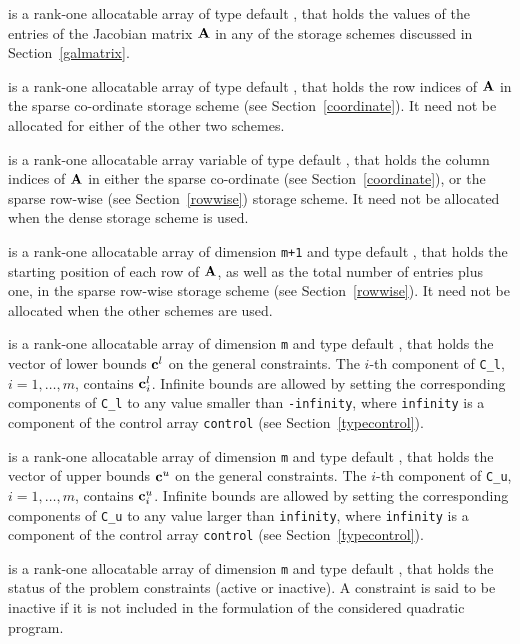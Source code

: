 \documentclass{galahad}
\begin{document}
\begin{description}
\begin{description}
 is a rank-one allocatable array of type default \realdp, that holds
the values of the entries of the Jacobian matrix ${\mathbf{A}}$ in any of the 
storage schemes discussed in Section~\ref{galmatrix}.

 is a rank-one allocatable array of type default \integer,
that holds the row indices of ${\mathbf{A}}$ in the sparse co-ordinate storage
scheme (see Section~\ref{coordinate}). 
It need not be allocated for either of the other two schemes.

 is a rank-one allocatable array variable of type default \integer,
that holds the column indices of ${\mathbf{A}}$ in either the sparse co-ordinate 
(see Section~\ref{coordinate}), or the sparse row-wise 
(see Section~\ref{rowwise}) storage scheme.
It need not be allocated when the dense storage scheme is used.

 is a rank-one allocatable array of dimension {\tt m+1} and type 
default \integer, that holds the 
starting position of each row of ${\mathbf{A}}$, as well
as the total number of entries plus one, in the sparse row-wise storage
scheme (see Section~\ref{rowwise}). It need not be allocated when the
other schemes are used.

\end{description}

 is a rank-one allocatable array of dimension {\tt m} and type 
default \realdp, that holds the vector of lower bounds ${\mathbf{c}}^{l}$ 
on the general constraints. The $i$-th component of 
{\tt C\_l}, $i = 1, \ldots , m$, contains ${\mathbf{c}}_{i}^{l}$.
Infinite bounds are allowed by setting the corresponding 
components of {\tt C\_l} to any value smaller than {\tt -infinity}, 
where {\tt infinity} is a component of the control array {\tt control} 
(see Section~\ref{typecontrol}).

 is a rank-one allocatable array of dimension {\tt m} and type 
default \realdp, that holds the vector of upper bounds ${\mathbf{c}}^{u}$ 
on the general constraints. The $i$-th component of 
{\tt C\_u}, $i = 1,  \ldots ,  m$, contains ${\mathbf{c}}_{i}^{u}$.
Infinite bounds are allowed by setting the corresponding 
components of {\tt C\_u} to any value larger than {\tt infinity}, 
where {\tt infinity} is a component of the control array {\tt control} 
(see Section~\ref{typecontrol}).

 is a rank-one allocatable array of dimension {\tt m} and type 
default \integer, that holds the status of the problem constraints (active or
inactive). A constraint is said to be inactive if it is not included in the
formulation of the considered quadratic program.


\end{description}
\end{document}
